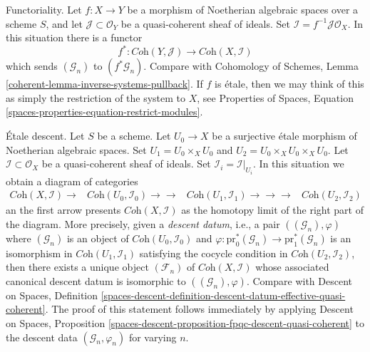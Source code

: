 \medskip\noindent
Functoriality. Let $f : X \to Y$ be a
morphism of Noetherian algebraic spaces over a scheme $S$, and
let $\mathcal{J} \subset \mathcal{O}_Y$ be a quasi-coherent sheaf
of ideals. Set $\mathcal{I} = f^{-1}\mathcal{J}\mathcal{O}_X$.
In this situation there is a functor
$$
f^* : \textit{Coh}(Y, \mathcal{J}) \longrightarrow \textit{Coh}(X, \mathcal{I})
$$
which sends $(\mathcal{G}_n)$ to $(f^*\mathcal{G}_n)$. Compare with
Cohomology of Schemes, Lemma \ref{coherent-lemma-inverse-systems-pullback}.
If $f$ is \'etale, then we may think of this as simply the restriction
of the system to $X$, see Properties of Spaces,
Equation \ref{spaces-properties-equation-restrict-modules}.

\medskip\noindent
\'Etale descent. Let $S$ be a scheme. Let $U_0 \to X$ be a surjective
\'etale morphism of Noetherian algebraic spaces. Set
$U_1 = U_0 \times_X U_0$ and $U_2 = U_0 \times_X U_0 \times_X U_0$.
Let $\mathcal{I} \subset \mathcal{O}_{X}$ be a quasi-coherent sheaf
of ideals. Set $\mathcal{I}_i = \mathcal{I}|_{U_i}$. In this situation
we obtain a diagram of categories
$$
\begin{array}{cccc}\textit{Coh}(X, \mathcal{I}) \longrightarrow & \textit{Coh}(U_0, \mathcal{I}_0) \longrightarrow\longrightarrow & \textit{Coh}(U_1, \mathcal{I}_1) \longrightarrow\longrightarrow\longrightarrow & \textit{Coh}(U_2, \mathcal{I}_2)\end{array}
$$
an the first arrow presents $\textit{Coh}(X, \mathcal{I})$ as the
homotopy limit of the right part of the diagram. More precisely, given
a {\it descent datum}, i.e., a pair $((\mathcal{G}_n), \varphi)$ where
$(\mathcal{G}_n)$ is an object of $\textit{Coh}(U_0, \mathcal{I}_0)$ and
$\varphi : \text{pr}_0^*(\mathcal{G}_n) \to \text{pr}_1^*(\mathcal{G}_n)$
is an isomorphism in $\textit{Coh}(U_1, \mathcal{I}_1)$
satisfying the cocycle condition in $\textit{Coh}(U_2, \mathcal{I}_2)$,
then there exists a unique object $(\mathcal{F}_n)$ of
$\textit{Coh}(X, \mathcal{I})$ whose associated canonical descent datum
is isomorphic to $((\mathcal{G}_n), \varphi)$. Compare with
Descent on Spaces, Definition
\ref{spaces-descent-definition-descent-datum-effective-quasi-coherent}.
The proof of this statement follows immediately by applying
Descent on Spaces, Proposition
\ref{spaces-descent-proposition-fpqc-descent-quasi-coherent}
to the descent data $(\mathcal{G}_n, \varphi_n)$ for varying $n$.

